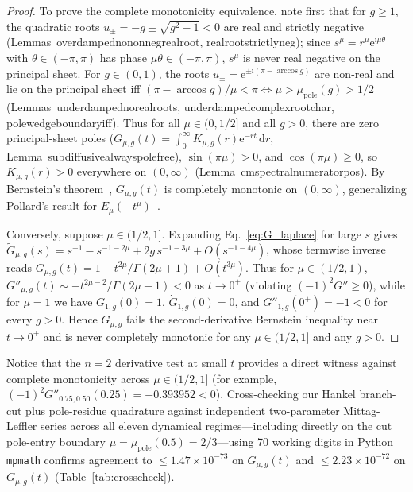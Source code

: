 \documentclass[twocolumn,10pt,amsmath,amssymb,floatfix]{revtex4-2}
\theoremstyle{plain}
\theoremstyle{definition}
\newcommand{\dd}{\mathrm{d}}
\newcommand{\ii}{\mathrm{i}}
\newcommand{\ee}{\mathrm{e}}
\newcommand{\mupole}{\mu_{\mathrm{pole}}}
\newcommand{\leanid}[1]{{\footnotesize\ttfamily\def\_{\textunderscore\penalty0\hspace{0pt}}#1}}
\begin{document}
\begin{proof}
To prove the complete monotonicity equivalence, note first that for $g \ge 1$, the quadratic roots $u_\pm = -g \pm \sqrt{g^2-1} < 0$ are real and strictly negative (Lemmas~\leanid{overdamped\_no\_nonneg\_real\_root}, \leanid{real\_root\_strictly\_neg}); since $s^\mu = r^\mu \ee^{\ii\mu\theta}$ with $\theta \in (-\pi,\pi)$ has phase $\mu\theta \in (-\pi,\pi)$, $s^\mu$ is never real negative on the principal sheet. For $g \in (0,1)$, the roots $u_\pm = \ee^{\pm\ii(\pi-\arccos g)}$ are non-real and lie on the principal sheet iff $(\pi - \arccos g)/\mu < \pi \iff \mu > \mupole(g) > 1/2$ (Lemmas~\leanid{underdamped\_no\_real\_roots}, \leanid{underdamped\_complex\_root\_char}, \leanid{pole\_wedge\_boundary\_iff}). Thus for all $\mu \in (0,1/2]$ and all $g > 0$, there are zero principal-sheet poles ($G_{\mu,g}(t) = \int_0^\infty K_{\mu,g}(r)\ee^{-rt}\,\dd r$, Lemma~\leanid{subdiffusive\_always\_pole\_free}), $\sin(\pi\mu) > 0$, and $\cos(\pi\mu) \ge 0$, so $K_{\mu,g}(r) > 0$ everywhere on $(0,\infty)$ (Lemma~\leanid{cm\_spectral\_numerator\_pos}). By Bernstein's theorem~\cite{Bernstein1929Acta,Schilling2012Book}, $G_{\mu,g}(t)$ is completely monotonic on $(0,\infty)$, generalizing Pollard's result for $E_\mu(-t^\mu)$~\cite{Pollard1948BAMS}.

Conversely, suppose $\mu \in (1/2, 1]$. Expanding Eq.~\eqref{eq:G_laplace} for large $s$ gives $\tilde{G}_{\mu,g}(s) = s^{-1} - s^{-1-2\mu} + 2g\,s^{-1-3\mu} + O(s^{-1-4\mu})$, whose termwise inverse reads $G_{\mu,g}(t) = 1 - t^{2\mu}/\Gamma(2\mu+1) + O(t^{3\mu})$. Thus for $\mu \in (1/2, 1)$, $G''_{\mu,g}(t) \sim -t^{2\mu-2}/\Gamma(2\mu-1) < 0$ as $t \to 0^+$ (violating $(-1)^2 G'' \ge 0$), while for $\mu = 1$ we have $G_{1,g}(0) = 1$, $\dot{G}_{1,g}(0) = 0$, and $G''_{1,g}(0^+) = -1 < 0$ for every $g > 0$. Hence $G_{\mu,g}$ fails the second-derivative Bernstein inequality near $t \to 0^+$ and is never completely monotonic for any $\mu \in (1/2, 1]$ and any $g > 0$.
\end{proof}

Notice that the $n=2$ derivative test at small $t$ provides a direct witness against complete monotonicity across $\mu \in (1/2, 1]$ (for example, $(-1)^2 G''_{0.75, 0.50}(0.25) = -0.393952 < 0$). Cross-checking our Hankel branch-cut plus pole-residue quadrature against independent two-parameter Mittag-Leffler series across all eleven dynamical regimes---including directly on the cut pole-entry boundary $\mu = \mupole(0.5) = 2/3$---using 70 working digits in Python \texttt{mpmath} confirms agreement to $\le 1.47 \times 10^{-73}$ on $G_{\mu,g}(t)$ and $\le 2.23 \times 10^{-72}$ on $\dot{G}_{\mu,g}(t)$ (Table~\ref{tab:crosscheck}).
\end{document}
